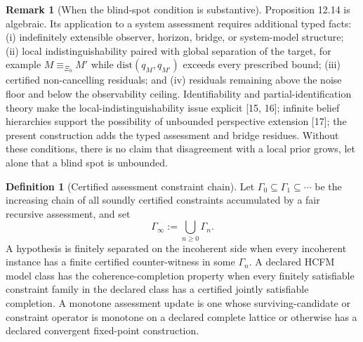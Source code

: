 \documentclass[11pt]{article}
\theoremstyle{definition}
\newtheorem{definition}{Definition}
\newtheorem{remark}{Remark}
\begin{document}
\begin{remark}[When the blind-spot condition is substantive]
Proposition 12.14 is algebraic. Its application to a system assessment requires additional typed facts: (i) indefinitely extensible observer, horizon, bridge, or system-model structure; (ii) local indistinguishability paired with global separation of the target, for example $M \equiv_{\Xi_0} M'$ while $\mathrm{dist}(q_M, q_{M'})$ exceeds every prescribed bound; (iii) certified non-cancelling residuals; and (iv) residuals remaining above the noise floor and below the observability ceiling. Identifiability and partial-identification theory make the local-indistinguishability issue explicit [15, 16]; infinite belief hierarchies support the possibility of unbounded perspective extension [17]; the present construction adds the typed assessment and bridge residues. Without these conditions, there is no claim that disagreement with a local prior grows, let alone that a blind spot is unbounded.
\end{remark}

\begin{definition}[Certified assessment constraint chain]
Let $\Gamma_0 \subseteq \Gamma_1 \subseteq \cdots$ be the increasing chain of all soundly certified constraints accumulated by a fair recursive assessment, and set
\begin{equation}
\Gamma_\infty := \bigcup_{n \geq 0} \Gamma_n. \tag{S32e}
\end{equation}
A hypothesis is finitely separated on the incoherent side when every incoherent instance has a finite certified counter-witness in some $\Gamma_n$. A declared HCFM model class has the coherence-completion property when every finitely satisfiable constraint family in the declared class has a certified jointly satisfiable completion. A monotone assessment update is one whose surviving-candidate or constraint operator is monotone on a declared complete lattice or otherwise has a declared convergent fixed-point construction.
\end{definition}
\end{document}

